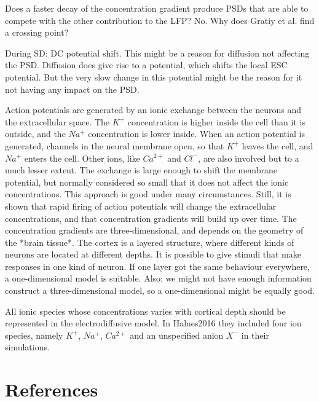 \documentclass{article}
\begin{document}
Does a faster decay of the concentration gradient produce PSDs that are able to compete with the other contribution to the LFP? No. Why does Gratiy et al. find a crossing point? 


During SD: DC potential shift. This might be a reason for diffusion not affecting the PSD. Diffusion does give rise to a potential, which shifts the local ESC potential. But the very slow change in this potential might be the reason for it not having any impact on the PSD.


Action potentials are generated by an ionic exchange between the neurons and the extracellular space. The $K^+$ concentration is higher inside the cell than it is outside, and the $Na^+$ concentration is lower inside. When an action potential is generated,  channels in the neural membrane open, so that $K^+$ leaves the cell, and $Na^+$ enters the cell. Other ions, like $Ca^{2+}$ and $Cl^-$, are also involved but to a much lesser extent. The exchange is large enough to shift the membrane potential, but normally considered so small that it does not affect the ionic concentrations. This approach is good under many circumstances. Still, it is shown that rapid firing of action potentials will change the extracellular concentrations, and that concentration gradients will build up over time. The concentration gradients are three-dimensional, and depends on the geometry of the *brain tissue*.  The cortex is a layered structure, where different kinds of neurons are located at different depths. It is possible to give stimuli that make responses in one kind of neuron. If one layer got the same behaviour everywhere, a one-dimensional model is suitable. Also: we might not have enough information construct a three-dimensional model, so a one-dimensional might be equally good. 

All ionic species whose concentrations varies with cortical depth should be represented in the electrodiffusive model. In Halnes2016 they included four ion species, namely $K^+$, $Na^+$, $Ca^{2+}$ and an unspecified anion $X^-$ in their simulations.

\section{References}
\end{document}
